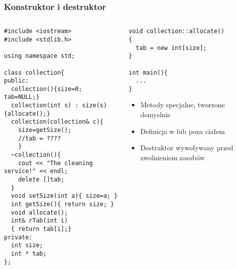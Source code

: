 \documentclass[10pt]{beamer}
\begin{document}
\begin{frame}[fragile]
  \frametitle{Konstruktor i destruktor}
  \begin{columns}
    \begin{column}{0.48\textwidth}
\vspace{-0.2cm}
\begin{lstlisting}
#include <iostream>
#include <stdlib.h>

using namespace std;

class collection{
public:
  collection(){size=0; tab=NULL;}
  collection(int s) : size(s) {allocate();}
  collection(collection& c){
    size=getSize();
    //tab = ????
    }
  ~collection(){
    cout << "The cleaning service!" << endl;
    delete []tab;
  }
  void setSize(int a){ size=a; }
  int getSize(){ return size; }
  void allocate();
  int& rTab(int i)
  { return tab[i];}
private:
  int size;
  int * tab;
};
\end{lstlisting}
    \end{column}
    \begin{column}{0.48\textwidth}
\begin{lstlisting}
void collection::allocate()
{
  tab = new int[size];
}

int main(){
  ...
}
\end{lstlisting}
      \begin{itemize}
        \item Metody specjalne, tworzone domyslnie
        \item Definicja w lub poza ciałem
        \item Destruktor wywoływany przed zwolnieniem zasobów
      \end{itemize}
    \end{column}
  \end{columns}
\end{frame}
\end{document}

